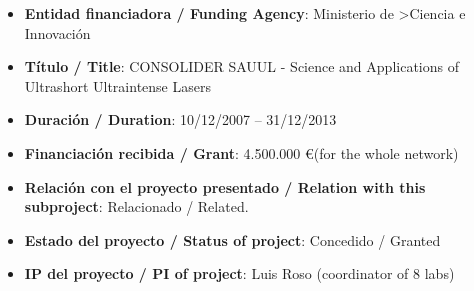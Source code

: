\begin{enumerate}
 
\begin{itemize}
	\item {\bf Entidad financiadora / Funding Agency}: Ministerio de >Ciencia e Innovaci\'on
	\item {\bf Título / Title}: CONSOLIDER SAUUL - Science and Applications of Ultrashort Ultraintense Lasers
	\item {\bf Duración / Duration}: 10/12/2007 -- 31/12/2013
	\item {\bf Financiación recibida / Grant}: 4.500.000 \euro (for the whole network)
	\item {\bf Relación con el proyecto presentado / Relation with this subproject}: Relacionado / Related. 
	\item {\bf Estado del proyecto / Status of project}: Concedido / Granted
	\item {\bf IP del proyecto / PI of project}: Luis Roso (coordinator of 8 labs)
\end{itemize}

\end{enumerate}

